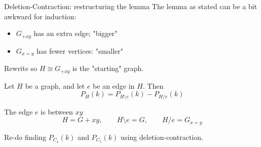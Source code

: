 \documentclass{beamer}
\begin{document}
\begin{frame}{Deletion-Contraction: restructuring the lemma}
The lemma as stated can be a bit awkward for induction:
\begin{itemize}
    \item $G_{+xy}$ has an extra edge; "bigger"
    \item $G_{x=y}$ has fewer vertices: "smaller"
\end{itemize}
Rewrite so $H\cong G_{+xy}$ is the "starting" graph.
\begin{lemma}
Let $H$ be a graph, and let $e$ be an edge in $H$.  Then
$$P_H(k)=P_{H\setminus e}(k)-P_{H/e}(k)$$
\end{lemma}  
The edge $e$ is between $xy$
$$H=G+xy,\qquad H\setminus e=G,\qquad H/e=G_{x=y}$$

\begin{example} Re-do finding $P_{C_4}(k)$ and $P_{C_5}(k)$ using deletion-contraction.
  
  \end{example}


\end{frame}  
\end{document}
